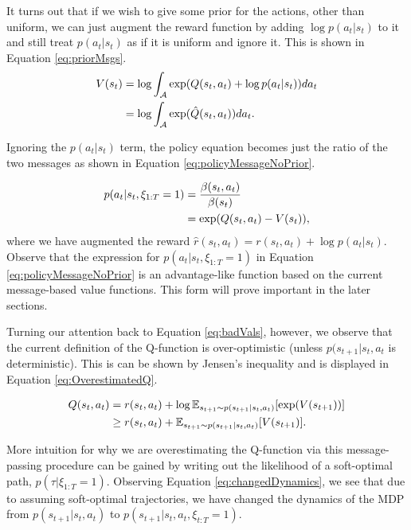 \documentclass{report}
\numberwithin{equation}{section}
\numberwithin{figure}{section}
\numberwithin{table}{section}
\numberwithin{algorithm}{section}
\begin{document}
It turns out that if we wish to give some prior for the actions, 
other than uniform, we can just augment the reward function 
by adding $\log p(a_t|s_t)$ to it and still treat $p(a_t|s_t)$ 
as if it is uniform and ignore it. This is shown in Equation 
\ref{eq:priorMsgs}.
\begin{align}\label{eq:priorMsgs}
  V(s_t)&=\log \int_{\mathcal{A}}\exp (Q(s_t, a_t) + \log p(a_t|s_t))da_t\notag\\
  &=\log \int_{\mathcal{A}}\exp (\hat{Q}(s_t, a_t))da_t.
\end{align}

Ignoring the $p(a_t|s_t)$ term, 
the policy equation becomes just the ratio 
of the two messages as shown in Equation \ref{eq:policyMessageNoPrior}.

\begin{align}\label{eq:policyMessageNoPrior}
  p(a_t|s_t, \xi_{1:T}=1)&=\frac{\beta(s_t, a_t)}{\beta(s_t)}\notag\\
  &=\exp(Q(s_t, a_t) - V(s_t)),
\end{align}
where we have augmented the reward $\hat{r}(s_t, a_t)=r(s_t,a_t) + \log p(a_t|s_t)$.
Observe that the expression for $p(a_t|s_t,\xi_{1:T}=1)$ in Equation 
\ref{eq:policyMessageNoPrior} is an advantage-like function based on 
the current message-based value functions. This form will prove 
important in the later sections.

Turning our attention back to Equation \ref{eq:badVals}, however, 
we observe that the current definition of the Q-function is 
over-optimistic (unless $p(s_{t+1}|s_t,a_t$ is deterministic). 
This is can be shown by Jensen's inequality and 
is displayed in Equation \ref{eq:OverestimatedQ}.

\begin{align}\label{eq:OverestimatedQ}
  Q(s_t,a_t)&=r(s_t, a_t) + \log\mathbb{E}_{s_{t+1}\sim p(s_{t+1}|s_t, a_t)}[\exp (V(s_{t+1}))]\notag\\
  &\ge r(s_t, a_t) + \mathbb{E}_{s_{t+1}\sim p(s_{t+1}|s_t, a_t)}[V(s_{t+1})].
\end{align}

More intuition for why we are overestimating the Q-function 
via this message-passing procedure can be gained by writing 
out the likelihood of a soft-optimal path, $p(\tau|\xi_{1:T}=1)$. 
Observing Equation \ref{eq:changedDynamics}, we see that due to 
assuming soft-optimal trajectories, we have changed the dynamics 
of the MDP from $p(s_{t+1}|s_t, a_t)$ to 
$p(s_{t+1}| s_t,a_t,\xi_{t:T}=1)$.
\end{document}
